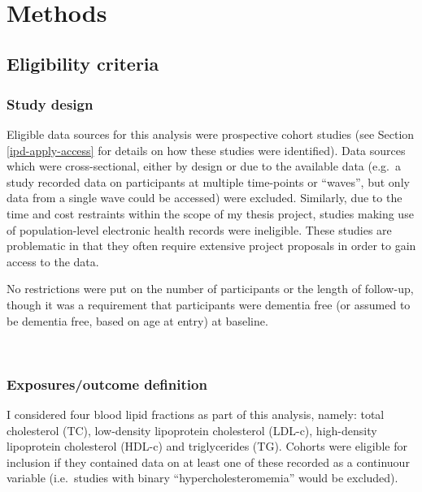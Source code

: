 \documentclass[a4paper, twoside]{templates/ociamthesis}
\begin{document}
~

\hypertarget{methods-2}{%
\section{Methods}\label{methods-2}}

\hypertarget{eligibility-criteria-1}{%
\subsection{Eligibility criteria}\label{eligibility-criteria-1}}

\hypertarget{study-design}{%
\subsubsection{Study design}\label{study-design}}

Eligible data sources for this analysis were prospective cohort studies (see Section \ref{ipd-apply-access} for details on how these studies were identified). Data sources which were cross-sectional, either by design or due to the available data (e.g.~a study recorded data on participants at multiple time-points or ``waves'', but only data from a single wave could be accessed) were excluded. Similarly, due to the time and cost restraints within the scope of my thesis project, studies making use of population-level electronic health records were ineligible. These studies are problematic in that they often require extensive project proposals in order to gain access to the data.

No restrictions were put on the number of participants or the length of follow-up, though it was a requirement that participants were dementia free (or assumed to be dementia free, based on age at entry) at baseline.

~

\hypertarget{exposuresoutcome-definition}{%
\subsubsection{Exposures/outcome definition}\label{exposuresoutcome-definition}}

I considered four blood lipid fractions as part of this analysis, namely: total cholesterol (TC), low-density lipoprotein cholesterol (LDL-c), high-density lipoprotein cholesterol (HDL-c) and triglycerides (TG). Cohorts were eligible for inclusion if they contained data on at least one of these recorded as a continuour variable (i.e.~studies with binary ``hypercholesteromemia'' would be excluded).
\end{document}
